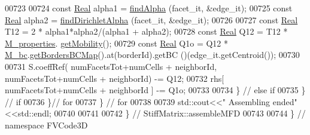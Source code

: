 \begin{DoxyCode}
00723                                         
00724                     \textcolor{keyword}{const} \hyperlink{namespaceFVCode3D_a40c1f5588a248569d80aa5f867080e83}{Real} alpha1 = \hyperlink{classFVCode3D_1_1StiffMatrix_a2365673b4791819e78c4c593e2f63b28}{findAlpha} (facet\_it, &edge\_it);
00725                     \textcolor{keyword}{const} \hyperlink{namespaceFVCode3D_a40c1f5588a248569d80aa5f867080e83}{Real} alpha2 = \hyperlink{classFVCode3D_1_1StiffMatrix_aec36126e4870fc3f94a2d36b831c739e}{findDirichletAlpha} (facet\_it, &edge\_it);
00726 
00727                     \textcolor{keyword}{const} \hyperlink{namespaceFVCode3D_a40c1f5588a248569d80aa5f867080e83}{Real} T12 = 2 * alpha1*alpha2/(alpha1 + alpha2);
00728                     \textcolor{keyword}{const} \hyperlink{namespaceFVCode3D_a40c1f5588a248569d80aa5f867080e83}{Real} Q12 = T12 * \hyperlink{classFVCode3D_1_1MatrixHandler_ad17a7941b1b8272f50fc6e1c660103fa}{M\_properties}.
      \hyperlink{classFVCode3D_1_1PropertiesMap_a810ea62ca881e4db57acd601bcea23cf}{getMobility}();
00729                     \textcolor{keyword}{const} \hyperlink{namespaceFVCode3D_a40c1f5588a248569d80aa5f867080e83}{Real} Q1o = Q12 * \hyperlink{classFVCode3D_1_1StiffMatrix_a23e3ffc97fcf112958e9966cac41e9d3}{M\_bc}.\hyperlink{classFVCode3D_1_1BoundaryConditions_a5b53a81bdab88709fae14892bfe6a7c9}{getBordersBCMap}().at(borderId).getBC
      ()(edge\_it.getCentroid());
00730 
00731                     S.coeffRef( numFacetsTot+numCells + neighborId, numFacetsTot+numCells + neighborId) -= 
      Q12; 
00732                     rhs[ numFacetsTot+numCells + neighborId ] -= Q1o;
00733 
00734                 \} \textcolor{comment}{// else if}
00735             \} \textcolor{comment}{// if}
00736         \}\textcolor{comment}{// for}
00737     \} \textcolor{comment}{// for}
00738     
00739     std::cout<<\textcolor{stringliteral}{" Assembling ended"}<<std::endl;
00740     
00741     
00742 \} \textcolor{comment}{// StiffMatrix::assembleMFD}
00743 
00744 \} \textcolor{comment}{// namespace FVCode3D}
\end{DoxyCode}
